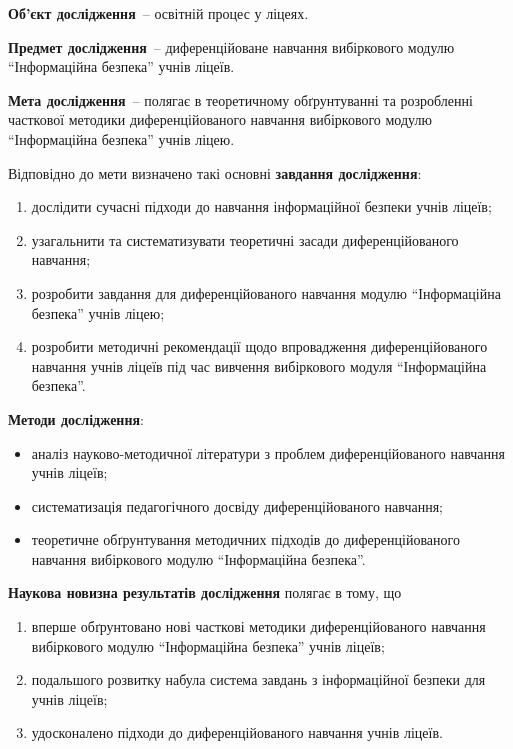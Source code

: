 \textbf{Об’єкт дослідження}~-- освітній процес у ліцеях.

\textbf{Предмет дослідження}~-- диференційоване навчання вибіркового модулю “Інформаційна безпека” учнів ліцеїв.

\textbf{Мета дослідження}~-- полягає в теоретичному обґрунтуванні та розробленні часткової методики диференційованого навчання вибіркового модулю “Інформаційна безпека” учнів ліцею.

Відповідно до мети визначено такі основні \textbf{завдання дослідження}: %
\begin{enumerate} [label=\arabic*)]%
    \item дослідити сучасні підходи до навчання інформаційної безпеки учнів ліцеїв;
    
    \item узагальнити та систематизувати теоретичні засади диференційованого навчання;

    \item розробити завдання для диференційованого навчання модулю ``Інформаційна безпека'' учнів ліцею;
    
    \item розробити методичні рекомендації щодо впровадження диференційованого навчання учнів ліцеїв під час вивчення вибіркового модуля ``Інформаційна безпека''. 
    
\end{enumerate}

\textbf{Методи дослідження}:
\begin{itemize}[label=--]
    \item аналіз науково-методичної літератури з проблем диференційованого  навчання учнів ліцеїв;
    \item систематизація педагогічного досвіду диференційованого навчання;
    \item теоретичне обґрунтування методичних підходів до  диференційованого навчання вибіркового модулю ``Інформаційна безпека''.
\end{itemize}


\textbf{Наукова новизна результатів дослідження} полягає в тому, що 
\begin{enumerate} [label=--]%

    \item 
вперше обґрунтовано нові часткові методики диференційованого навчання  вибіркового модулю ``Інформаційна безпека'' учнів ліцеїв;
    \item 
подальшого розвитку набула система завдань з інформаційної безпеки для учнів ліцеїв;
    \item 
удосконалено підходи до диференційованого навчання учнів ліцеїв.

\end{enumerate}



